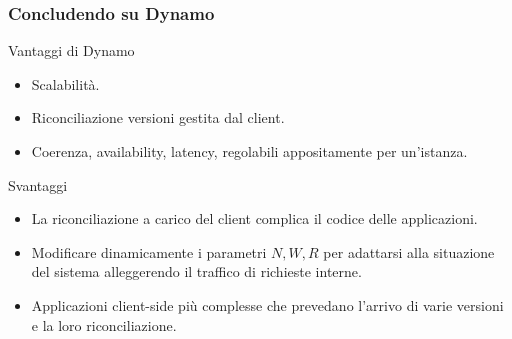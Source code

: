 

\begin{frame}
  \frametitle{Concludendo su Dynamo}
  \begin{block}{Vantaggi di Dynamo}
    \begin{itemize}
    \item Scalabilità.
    \item Riconciliazione versioni gestita dal client.
    \item Coerenza, availability, latency, regolabili appositamente per un'istanza.
    \end{itemize}
  \end{block}
  \begin{block}{Svantaggi}
  \begin{itemize}
  \item La riconciliazione a carico del client complica il codice delle applicazioni.
  \item Modificare dinamicamente i parametri $N, W, R$ per adattarsi alla situazione del sistema alleggerendo il traffico di richieste interne.
  \item Applicazioni client-side più complesse che prevedano l'arrivo di varie versioni e la loro riconciliazione.
  \end{itemize}
  \end{block}
\end{frame}

